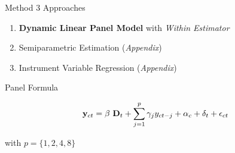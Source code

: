 \documentclass[
  ignorenonframetext,
]{beamer}
\providecommand{\tightlist}{%
  \setlength{\itemsep}{0pt}\setlength{\parskip}{0pt}}\usepackage{longtable,booktabs,array}
\begin{document}
\begin{frame}{Method}
\protect\hypertarget{method}{}
3 Approaches

\begin{enumerate}
\tightlist
\item
  \textbf{Dynamic Linear Panel Model} with \emph{Within Estimator}
\item
  Semiparametric Estimation (\emph{Appendix})
\item
  Instrument Variable Regression (\emph{Appendix})
\end{enumerate}

Panel Formula

\[
\bold{y}_{ct} = \beta \ \bold{D}_t + \sum_{j=1}^p \gamma_j y_{ct-j} + \alpha_c + \delta_t + \epsilon_{ct}
\]

with \(p = \{1,2,4,8\}\)
\end{frame}
\end{document}
